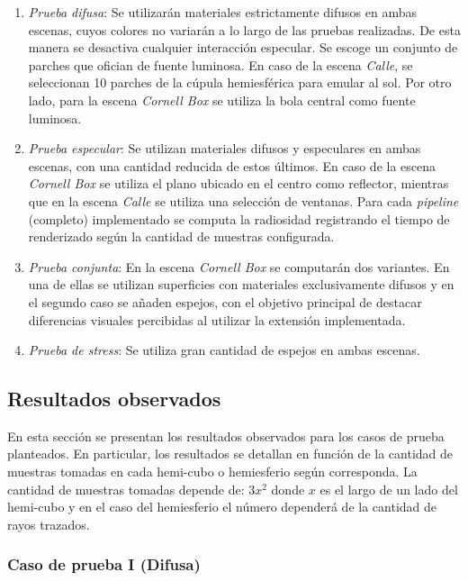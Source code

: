 \begin{enumerate}
	\item \textit{Prueba difusa}: Se utilizarán materiales estrictamente difusos en ambas escenas, cuyos colores no variarán a lo largo de las pruebas realizadas. De esta manera se desactiva cualquier interacción especular. Se escoge un conjunto de parches que ofician de fuente luminosa. En caso de la escena \textit{Calle}, se seleccionan 10 parches de la cúpula hemiesférica para emular al sol. Por otro lado, para la escena \textit{Cornell Box} se utiliza la bola central como fuente luminosa.
	\item \textit{Prueba especular}: Se utilizan materiales difusos y especulares en ambas escenas, con una cantidad reducida de estos últimos. En caso de la escena \textit{Cornell Box} se utiliza el plano ubicado en el centro como reflector, mientras que en la escena \textit{Calle} se utiliza una selección de ventanas. Para cada \textit{pipeline} (completo) implementado se computa la radiosidad registrando el tiempo de renderizado según la cantidad de muestras configurada.
	\item \textit{Prueba conjunta}: En la escena \textit{Cornell Box} se computarán dos variantes. En una de ellas se utilizan superficies con materiales exclusivamente difusos y en el segundo caso se añaden espejos, con el objetivo principal de destacar diferencias visuales percibidas al utilizar la extensión implementada.
	\item \textit{Prueba de stress}: Se utiliza gran cantidad de espejos en ambas escenas.
\end{enumerate}

\subsection{Resultados observados}

En esta sección se presentan los resultados observados para los casos de prueba planteados. En particular, los resultados se detallan en función de la cantidad de muestras tomadas en cada hemi-cubo o hemiesferio según corresponda. La cantidad de muestras tomadas depende de: $3 x^{2}$ donde $x$ es el largo de un lado del hemi-cubo y en el caso del hemiesferio el número dependerá de la cantidad de rayos trazados.


\subsubsection{Caso de prueba I (Difusa)}

